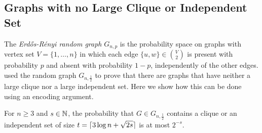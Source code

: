 \documentclass[format=acmsmall, review=false, screen=true]{acmart}
\begin{document}
\subsection{Graphs with no Large Clique or Independent Set}

The \emph{Erd\H{o}s-R\'enyi random graph} $G_{n,p}$ is the
probability space on
graphs with vertex set $V=\{1,\ldots,n\}$ in which each edge $\{u,
w\} \in \binom{V}{2}$ is present with probability $p$ and absent with
probability $1-p$, independently of the other edges.  
 used the random graph $G_{n,\frac{1}{2}}$ to prove
that there are graphs that have neither a large clique nor a large 
independent set. Here we show how this can be done using an encoding
argument.

\begin{thm}
  For $n \ge 3$ and $s \in \mathbb{N}$, the probability that $G \in G_{n,\frac{1}{2}}$
  contains a clique or an independent set of size $t = {\lceil 3\log n +
    \sqrt{2s} \rceil}$ is at most $2^{-s}$.
\end{thm}
\end{document}
